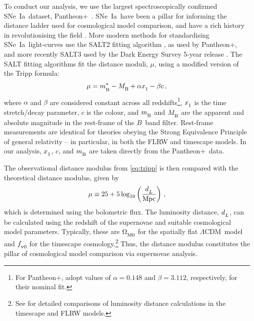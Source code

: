 \documentclass[fleqn,usenatbib,onecolumn,referee]{mnras}
\newcommand{\pplus}{Pantheon$+$}
\newcommand{\LA}{\Lambda}
\newcommand{\lcdm}{spatially flat $\LA$CDM}
\newcommand{\sne}{SNe~Ia}
\newcommand{\Z}[1]{_{\lower2pt\hbox{$\scriptstyle#1$}}}
\newcommand{\Ns}[1]{_{\lower2pt\hbox{$\scriptstyle\rm#1$}}}
\newcommand{\dL}{d\Z{L}}
\begin{document}
To conduct our analysis, we use the largest spectroscopically confirmed \sne\ dataset, \pplus\ \citep{Scolnic_2022}. \sne\ have been a pillar for informing the distance ladder used for cosmological model comparison, and have a rich history in revolutionising the field \citep{Riess_1998, Perlmutter_1999}. More modern methods for standardising \sne\ light-curves use the SALT2 fitting algorithm \citep{Guy_2007, Taylor_2021}, as used by \pplus, and more recently SALT3 \citep{Kenworthy_2021} used by the Dark Energy Survey 5-year release \citep[DES5yr,][]{DES_2024}. The SALT fitting algorithms fit the distance moduli, $\mu$, using a modified version%
of the Tripp formula:
\begin{equation}\label{eq:tripp}
    \mu = m\Ns{B}^* - M\Ns{B} + \alpha x\Z 1 - \beta c\,,
\end{equation}
where $\alpha$ and $\beta$ are considered constant across all redshifts\footnote{For \pplus, \citet{Scolnic_2022} adopt values of $\alpha = 0.148$ and $\beta = 3.112$, respectively, for their nominal fit.}, $x\Z 1$ is the time stretch/decay parameter, $c$ is the colour, and $m\Ns{B}$ and $M\Ns{B}$ are the apparent and absolute magnitude in the rest-frame of the $B$~band filter. Rest-frame measurements are identical for theories obeying the Strong Equivalence Principle of general relativity -- in particular, in both the FLRW and timescape models. In our analysis, $x\Z 1$, $c$, and $m\Ns{B}$ are taken directly from the \pplus\ data.

The observational distance modulus from \cref{eq:tripp} is then compared with the theoretical distance modulus, given by
\begin{equation}
    \mu \equiv 25 + 5 \log_{10}\left(\frac{\dL}{\rm Mpc}\right)\label{eq:mu}\,,
\end{equation}
which is determined using the bolometric flux. The luminosity distance, $\dL$, can be calculated using the redshift of the supernovae and suitable cosmological model parameters. Typically, these are $\Omega\Ns{M0}$ for the \lcdm\ model and $f\Ns{v0}$ for the timescape cosmology.\footnote{See \citet[Appendix~A]{Dam_2017} for detailed comparisons of luminosity distance calculations in the timescape and FLRW models.} Thus, the distance modulus constitutes the pillar of cosmological model comparison via supernovae analysis.
\end{document}
